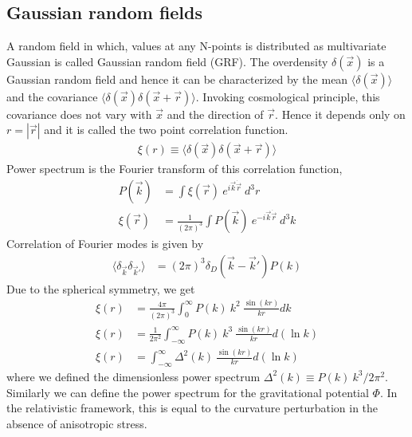 \documentclass[12pt]{article}
\begin{document}
\subsection{Gaussian random fields}
\label{sec:grf}
A random field in which, values at any N-points is distributed as multivariate Gaussian is called Gaussian random field (GRF). The overdensity $\delta(\vec{x})$ is a Gaussian random field and hence it can be characterized by the mean $\langle \delta(\vec{x}) \rangle$ and the covariance $\langle \delta(\vec{x}) \delta(\vec{x} + \vec{r}) \rangle$. Invoking cosmological principle, this covariance does not vary with $\vec{x}$ and the direction of $\vec{r}$. Hence it depends only on $r = |\vec{r}|$ and it is called the two point correlation function.
\begin{align}
\xi(r) \equiv \langle \delta(\vec{x}) \delta(\vec{x} + \vec{r}) \rangle
\end{align}
Power spectrum is the Fourier transform of this correlation function,
\begin{align}
P(\vec{k}) &= \int \xi(\vec{r}) ~e^{i \vec{k} \dot \vec{r}} ~d^3r\\
\xi(\vec{r}) &= \frac{1}{(2\pi)^3} \int P(\vec{k}) ~e^{-i \vec{k} \dot \vec{r}} ~d^3 k
\end{align}
Correlation of Fourier modes is given by
\begin{align}
\langle \delta_{\vec{k}} \delta_{\vec{k}'} \rangle &= (2 \pi)^3 \delta_{D} (\vec{k} - \vec{k}') P(k)
\end{align}
Due to the spherical symmetry, we get
\begin{align}
\xi(r) &= \frac{4 \pi}{(2\pi)^3} \int_{0}^{\infty} P(k) ~k^2 ~\frac{\sin(kr)}{kr} dk\\
\xi(r) &= \frac{1}{2\pi^2} \int_{-\infty}^{\infty} P(k) ~k^3 ~\frac{\sin(kr)}{kr} d(\ln k)\\
\xi(r) &= \int_{-\infty}^{\infty} \Delta^2(k) ~\frac{\sin(kr)}{kr} d(\ln k)
\end{align}
where we defined the dimensionless power spectrum $\Delta^2(k) \equiv P(k) ~{k^3}/{2 \pi^2}$.\\
Similarly we can define the power spectrum for the gravitational potential $\Phi$. In the relativistic framework, this is equal to the curvature perturbation in the absence of anisotropic stress.
\end{document}
